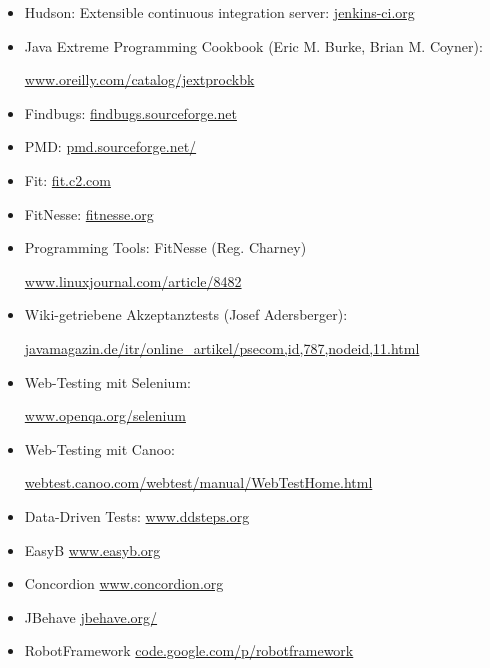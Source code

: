 \begin{itemize}
\item Hudson: Extensible continuous integration server:
\href{http://jenkins-ci.org}{jenkins-ci.org}
%
\item Java Extreme Programming Cookbook (Eric M. Burke, Brian M. Coyner):

  \href{http://www.oreilly.com/catalog/jextprockbk}
      {www.oreilly.com/catalog/jextprockbk}
%
\item Findbugs:
  \href{http://findbugs.sourceforge.net}{findbugs.sourceforge.net}
\item PMD:
  \href{http://pmd.sourceforge.net/}{pmd.sourceforge.net/}
\item Fit: \href{http://fit.c2.com}{fit.c2.com}
\item FitNesse: \href{http://fitnesse.org}{fitnesse.org}
\item Programming Tools: FitNesse (Reg. Charney)

\href{http://www.linuxjournal.com/article/8482}
    {www.linuxjournal.com/article/8482}
\item Wiki-getriebene Akzeptanztests (Josef Adersberger):

\href{http://javamagazin.de/itr/online_artikel/psecom,id,787,nodeid,11.html}
     {javamagazin.de/itr/online\_artikel/psecom,id,787,nodeid,11.html}

%

\item Web-Testing mit Selenium:

\href{http://www.openqa.org/selenium}{www.openqa.org/selenium}
%
\item Web-Testing mit Canoo:

\href{http://webtest.canoo.com/webtest/manual/WebTestHome.html}
{webtest.canoo.com/webtest/manual/WebTestHome.html}

\item Data-Driven Tests:
  \href{http://www.ddsteps.org}{www.ddsteps.org}
\item EasyB \href{http://www.easyb.org}{www.easyb.org}
\item Concordion \href{http://www.concordion.org}{www.concordion.org}
\item JBehave \href{http://jbehave.org/}{jbehave.org/}
\item RobotFramework \href{http://code.google.com/p/robotframework}{code.google.com/p/robotframework}
\end{itemize}
%
%
%
